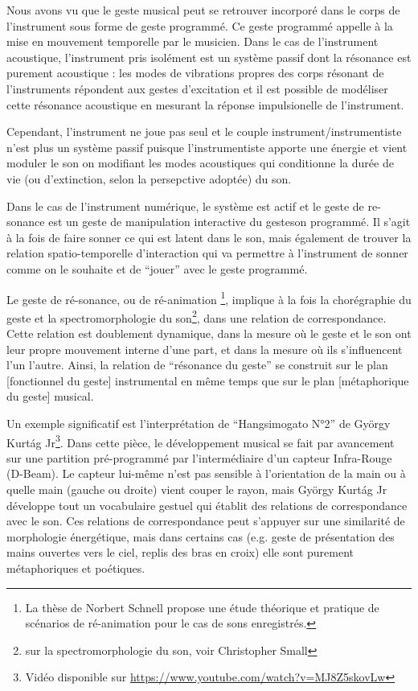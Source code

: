 Nous avons vu que le geste musical peut se retrouver incorporé dans le corps de l'instrument sous forme de geste programmé. Ce geste programmé appelle à la mise en mouvement temporelle par le musicien.
Dans le cas de l'instrument acoustique, l'instrument pris isolément est un système passif dont la résonance est purement acoustique : les modes de vibrations propres des corps résonant de l'instruments répondent aux gestes d'excitation et il est possible de modéliser cette résonance acoustique en mesurant la réponse impulsionelle de l'instrument.

Cependant, l'instrument ne joue pas seul et le couple instrument/instrumentiste n'est plus un système passif puisque l'instrumentiste apporte une énergie et vient moduler le son on modifiant les modes acoustiques qui conditionne la durée de vie (ou d'extinction, selon la persepctive adoptée) du son.

Dans le cas de l'instrument numérique, le système est actif et le geste de re-sonance est un geste de manipulation interactive du geste\/son programmé.
Il s'agit à la fois de faire sonner ce qui est latent dans le son, mais également de trouver la relation spatio-temporelle d'interaction qui va permettre à l'instrument de sonner comme on le souhaite et de ``jouer'' avec le geste programmé.

Le geste de ré-sonance, ou de ré-animation \footnote{La thèse de Norbert Schnell \cite{schnell_playing_2013} propose une étude théorique et pratique de scénarios de ré-animation pour le cas de sons enregistrés.}, implique à la fois la chorégraphie du geste et la spectromorphologie du son\footnote{sur la spectromorphologie du son, voir Christopher Small}, dans une relation de correspondance. Cette relation est doublement dynamique, dans la mesure où le geste et le son ont leur propre mouvement interne d'une part, et dans la mesure où ils s'influencent l'un l'autre. Ainsi, la relation de ``résonance du geste'' se construit sur le plan [fonctionnel du geste] instrumental en même temps que sur le plan [métaphorique du geste] musical.

Un exemple significatif est l'interprétation de ``Hangsimogato N°2'' de György Kurtág Jr\footnote{Vidéo disponible sur \url{https://www.youtube.com/watch?v=MJ8Z5skovLw}}. Dans cette pièce, le développement musical se fait par avancement sur une partition pré-programmé par l'intermédiaire d'un capteur Infra-Rouge (D-Beam). Le capteur lui-même n'est pas sensible à l'orientation de la main ou à quelle main (gauche ou droite) vient couper le rayon, mais György Kurtág Jr développe tout un vocabulaire gestuel qui établit des relations de correspondance avec le son. Ces relations de correspondance peut s'appuyer sur une similarité de morphologie énergétique, mais dans certains cas (e.g. geste de présentation des mains ouvertes vers le ciel, replis des bras en croix) elle sont purement métaphoriques et poétiques.

